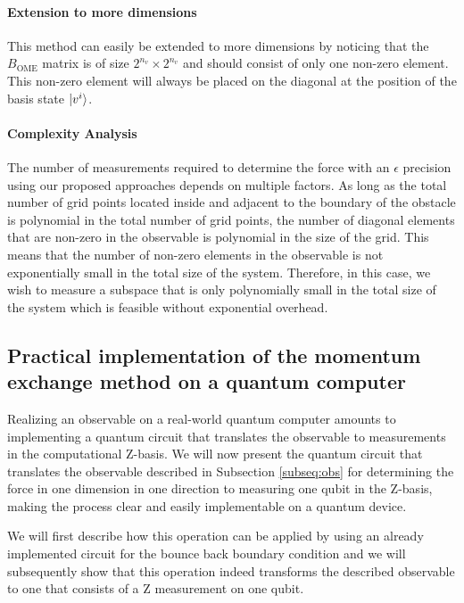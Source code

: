 \paragraph*{Extension to more dimensions}
This method can easily be extended to more dimensions by noticing that the $B_\text{OME}$ matrix is of size $2^{n_v} \times 2^{n_v}$ and should consist of only one non-zero element. This non-zero element will always be placed on the diagonal at the position of the basis state $\ket{v^i}$. 

\paragraph*{Complexity Analysis}\label{sec:CA}
The number of measurements required to determine the force with an $\epsilon$ precision using our proposed approaches depends on multiple factors. 
As long as the total number of grid points located inside and adjacent to the boundary of the obstacle is polynomial in the total number of grid points, the number of diagonal elements that are non-zero in the observable is polynomial in the size of the grid. This means that the number of non-zero elements in the observable is not exponentially small in the total size of the system. Therefore, in this case, we wish to measure a subspace that is only polynomially small in the total size of the system which is feasible without exponential overhead. 

\subsection{Practical implementation of the momentum exchange method on a quantum computer}\label{sec:prac_impl}
Realizing an observable on a real-world quantum computer amounts to implementing a quantum circuit that translates the observable to measurements in the computational Z-basis.
We will now present the quantum circuit that translates the observable described in Subsection \ref{subseq:obs} for determining the force in one dimension in one direction to measuring one qubit in the Z-basis, making the process clear and easily implementable on a quantum device. 

We will first describe how this operation can be applied by using an already implemented circuit for the bounce back boundary condition and we will subsequently show that this operation indeed transforms the described observable to one that consists of a Z measurement on one qubit. 

